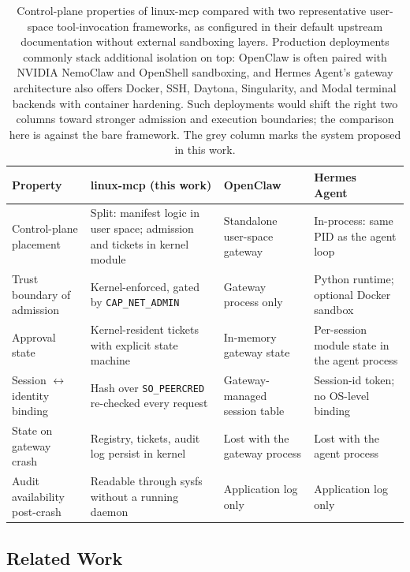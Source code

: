 \begin{table}[t]
\centering
\caption{Control-plane properties of linux-mcp compared with two representative user-space tool-invocation frameworks, as configured in their default upstream documentation without external sandboxing layers. Production deployments commonly stack additional isolation on top: OpenClaw is often paired with NVIDIA NemoClaw and OpenShell sandboxing, and Hermes Agent's gateway architecture also offers Docker, SSH, Daytona, Singularity, and Modal terminal backends with container hardening. Such deployments would shift the right two columns toward stronger admission and execution boundaries; the comparison here is against the bare framework. The grey column marks the system proposed in this work.}
\label{tab:comparison}
\footnotesize
\setlength{\tabcolsep}{5pt}
\renewcommand{\arraystretch}{1.25}
\begin{tabularx}{\textwidth}{@{}l >{\columncolor{gray!8}}X X X@{}}
\toprule
\textbf{Property}
  & \textbf{linux-mcp (this work)}
  & \textbf{OpenClaw~\cite{openclaw2026}}
  & \textbf{Hermes Agent~\cite{nousresearch2026hermesagent}} \\
\midrule
Control-plane placement
  & Split: manifest logic in user space; admission and tickets in kernel module
  & Standalone user-space gateway
  & In-process: same PID as the agent loop \\
Trust boundary of admission
  & Kernel-enforced, gated by \texttt{CAP\_NET\_ADMIN}
  & Gateway process only
  & Python runtime; optional Docker sandbox \\
Approval state
  & Kernel-resident tickets with explicit state machine
  & In-memory gateway state
  & Per-session module state in the agent process \\
Session $\leftrightarrow$ identity binding
  & Hash over \texttt{SO\_PEERCRED} re-checked every request
  & Gateway-managed session table
  & Session-id token; no OS-level binding \\
State on gateway crash
  & Registry, tickets, audit log persist in kernel
  & Lost with the gateway process
  & Lost with the agent process \\
Audit availability post-crash
  & Readable through sysfs without a running daemon
  & Application log only
  & Application log only \\
\bottomrule
\end{tabularx}
\end{table}


\subsection{Related Work}
\label{sec:related-work}

